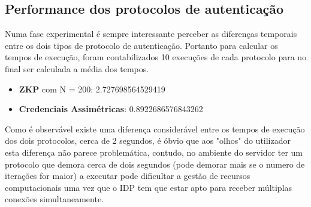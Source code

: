 \subsection{Performance dos protocolos de autenticação}

\quad Numa fase experimental é sempre interessante perceber as diferenças temporais entre os dois tipos de protocolo de autenticação. Portanto para calcular os tempos de execução, foram contabilizados 10 execuções de cada protocolo para no final ser calculada a média dos tempos.

\begin{itemize}
    \item \textbf{ZKP} com N = 200: 2.727698564529419
    \item \textbf{Credenciais Assimétricas}: 0.8922686576843262
\end{itemize}


\quad Como é observável existe uma diferença considerável entre os tempos de execução dos dois protocolos, cerca de 2 segundos, é óbvio que aos "olhos" do utilizador esta diferença não parece problemática, contudo, no ambiente do servidor ter um protocolo que demora cerca de dois segundos (pode demorar mais se o numero de iterações for maior) a executar pode dificultar a gestão de recursos computacionais uma vez que o IDP tem que estar apto para receber múltiplas conexões simultaneamente.